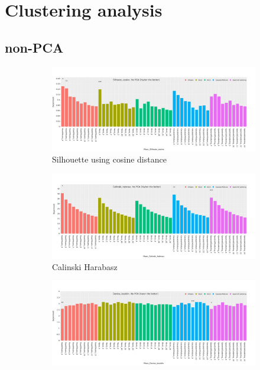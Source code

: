 \section{Clustering analysis} \label{s:ap:cs}


\subsection{non-PCA} \label{s:ap:non-pca}


\begin{figure}[!h]
    \captionsetup[subfigure]{justification=Centering}
    \centering
    \begin{subfigure}[!t]{0.3\textwidth}
        \includegraphics[width=\textwidth]{Sections/ClusteringAnalysis/Resources/cs_top3/nonPCA/non_PCA_top3_Silhoute_cosine.png}
        \caption{Silhouette using cosine distance}
        \label{fig:ap:cosine}
    \end{subfigure}
    \centering
    \begin{subfigure}[!t]{0.3\textwidth}
        \includegraphics[width=\textwidth]{Sections/ClusteringAnalysis/Resources/cs_top3/nonPCA/non_PCA_top3_Calinski_habrasz.png}
        \caption{Calinski Harabasz}
        \label{fig:ap:cal_hab}
    \end{subfigure}
    \centering
    \begin{subfigure}[!t]{0.3\textwidth}
        \includegraphics[width=\textwidth]{Sections/ClusteringAnalysis/Resources/cs_top3/nonPCA/non_PCA_top3_Davies_bouldin.png}

\end{subfigure}
\end{figure}
